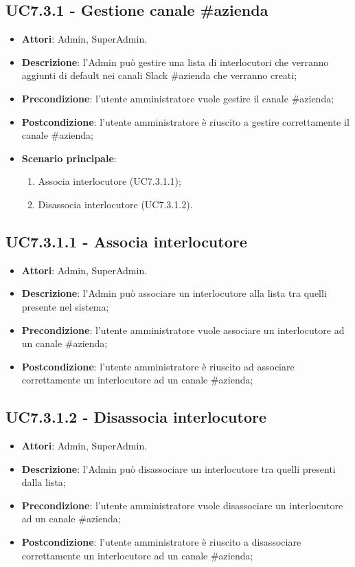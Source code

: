 \documentclass[../AnalisiDeiRequisiti.tex]{subfiles}
\begin{document}
\subsection{UC7.3.1 - Gestione canale \#azienda} 
\label{sssec:UC7.3.1} 
\begin{itemize} 
\item \textbf{Attori}: Admin, SuperAdmin.
\item \textbf{Descrizione}: l'Admin può gestire una lista di interlocutori che verranno aggiunti di default nei canali Slack \#azienda che verranno creati;
\item \textbf{Precondizione}: l'utente amministratore vuole gestire il canale \#azienda;
\item \textbf{Postcondizione}: l'utente amministratore è riuscito a gestire correttamente il canale \#azienda;
\item \textbf{Scenario principale}: \begin{enumerate}\item Associa interlocutore (UC7.3.1.1);\item Disassocia interlocutore (UC7.3.1.2). 
 \end{enumerate}
\end{itemize} 
\subsection{UC7.3.1.1 - Associa interlocutore} 
\label{sssec:UC7.3.1.1} 
\begin{itemize} 
\item \textbf{Attori}: Admin, SuperAdmin.
\item \textbf{Descrizione}: l'Admin può associare un interlocutore alla lista tra quelli presente nel sistema;
\item \textbf{Precondizione}: l'utente amministratore vuole associare un interlocutore ad un canale \#azienda;
\item \textbf{Postcondizione}: l'utente amministratore è riuscito ad associare correttamente un interlocutore ad un canale \#azienda;
\end{itemize} 
\subsection{UC7.3.1.2 - Disassocia interlocutore} 
\label{sssec:UC7.3.1.2} 
\begin{itemize} 
\item \textbf{Attori}: Admin, SuperAdmin.
\item \textbf{Descrizione}: l'Admin può disassociare un interlocutore tra quelli presenti dalla lista;
\item \textbf{Precondizione}: l'utente amministratore vuole disassociare un interlocutore ad un canale \#azienda;
\item \textbf{Postcondizione}: l'utente amministratore è riuscito a disassociare correttamente un interlocutore ad un canale \#azienda;
\end{itemize} 
\end{document}
